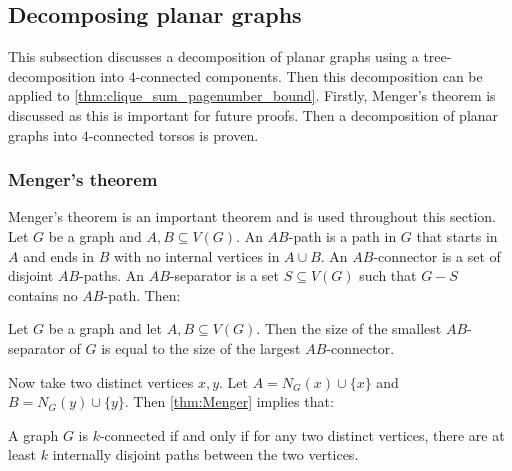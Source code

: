 \subsection{Decomposing planar graphs}
This subsection discusses a decomposition of planar graphs using a tree-decomposition into $4$-connected components. Then this decomposition can be applied to \cref{thm:clique_sum_pagenumber_bound}. Firstly, Menger's theorem is discussed as this is important for future proofs. Then a decomposition of planar graphs into $4$-connected torsos is proven.

\subsubsection{Menger's theorem}

Menger's theorem \cite{mengerZurAllgemeinenKurventheorie1927} is an important theorem and is used throughout this section. 
Let \(G\) be a graph and \(A, B \subseteq V(G)\). An \(AB\)-path is a path in \(G\) that starts in \(A\) and ends in \(B\) with no internal vertices in \(A \cup B\). An \(AB\)-connector is a set of disjoint \(AB\)-paths. An \(AB\)-separator is a set \(S \subseteq V(G)\) such that \(G - S\) contains no \(AB\)-path. Then:
\begin{theorem}\label{thm:Menger}
	Let $G$ be a graph and let $A, B \subseteq V(G)$. Then the size of the smallest \(AB\)-separator of \(G\) is equal to the size of the largest \(AB\)-connector.
\end{theorem}
Now take two distinct vertices \(x, y\). Let \(A = N_G(x) \cup \{x\} \) and \(B = N_G(y) \cup \{y\} \). Then \cref{thm:Menger} implies that:
\begin{theorem}\label{thm:Menger_Vertex}
	A graph \(G\) is \(k\)-connected if and only if for any two distinct vertices, there are at least \(k\) internally disjoint paths between the two vertices.
\end{theorem}

